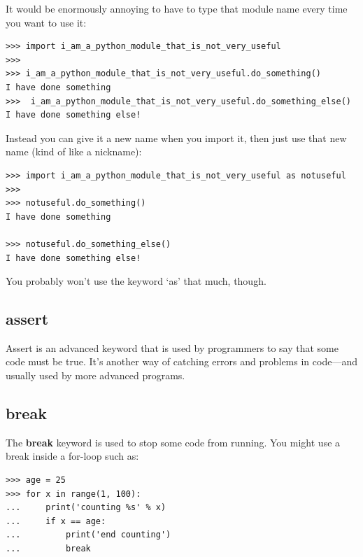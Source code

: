 \noindent
It would be enormously annoying to have to type that module name every time you want to use it:

\begin{listingignore}
\begin{verbatim}
>>> import i_am_a_python_module_that_is_not_very_useful
>>>
>>> i_am_a_python_module_that_is_not_very_useful.do_something()
I have done something
>>>  i_am_a_python_module_that_is_not_very_useful.do_something_else()
I have done something else!
\end{verbatim}
\end{listingignore}

\noindent
Instead you can give it a new name when you import it, then just use that new name (kind of like a nickname):

\begin{listingignore}
\begin{verbatim}
>>> import i_am_a_python_module_that_is_not_very_useful as notuseful
>>>
>>> notuseful.do_something()
I have done something

>>> notuseful.do_something_else()
I have done something else!
\end{verbatim}
\end{listingignore}

\noindent
You probably won't use the keyword `as' that much, though.

\subsection*{assert}

Assert is an advanced keyword that is used by programmers to say that some code must be true. It's another way of catching errors and problems in code---and usually used by more advanced programs.

\subsection*{break}

The \textbf{break} keyword is used to stop some code from running. You might use a break inside a for-loop such as:

\begin{listing}
\begin{verbatim}
>>> age = 25
>>> for x in range(1, 100):
...     print('counting %s' % x)
...     if x == age:
...         print('end counting')
...         break
\end{verbatim}
\end{listing}

